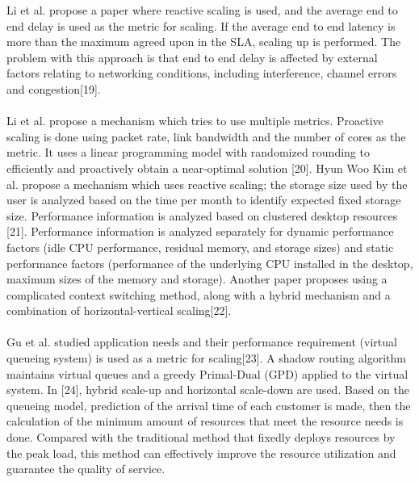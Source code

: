 \documentclass[conference]{IEEEtran}
\begin{document}
Li et al. propose a paper where reactive scaling is used, and the average end to end delay is used as the metric for scaling. If the average end to end latency is more than the maximum agreed upon in the SLA, scaling up is performed. The problem with this approach is that end to end delay is affected by external factors relating to networking conditions, including interference, channel errors and congestion[19]. \\ \\

Li et al. propose a mechanism which tries to use multiple metrics. Proactive scaling is done using packet rate, link bandwidth and the number of cores as the metric. It uses a linear programming model with randomized rounding to efficiently and proactively obtain a near-optimal solution [20]. Hyun Woo Kim et al. propose a mechanism which uses reactive scaling; the storage size used by the user is analyzed based on the time per month to identify expected fixed storage size. Performance information is analyzed based on clustered desktop resources [21]. Performance information is analyzed separately for dynamic performance factors (idle CPU performance, residual memory, and storage sizes) and static performance factors (performance of the underlying CPU installed in the desktop, maximum sizes of the memory and storage). Another paper proposes using a complicated context switching method, along with a hybrid mechanism and a combination of horizontal-vertical scaling[22]. \\ \\

Gu et al. studied application needs and their performance requirement (virtual queueing system) is used as a metric for scaling[23]. A shadow routing algorithm maintains virtual queues and a greedy Primal-Dual (GPD) applied to the virtual system. In [24], hybrid scale-up and horizontal scale-down are used. Based on the queueing model, prediction of the arrival time of each customer is made, then the calculation of the minimum amount of resources that meet the resource needs is done. Compared with the traditional method that fixedly deploys resources by the peak load, this method can effectively improve the resource utilization and guarantee the quality of service. \\ \\
\end{document}
